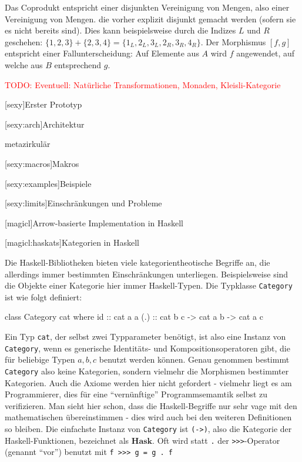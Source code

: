 \documentclass[a4paper, bibgerm]{article}
\newcommand\icode[1]{\lstinline?#1?}
\newcommand{\todo}[1]{
  \textcolor{red}{TODO: #1}
}
\newcommand\lsection{}
\newcommand\lsubsection{}
\begin{document}
Das Coprodukt entspricht einer disjunkten Vereinigung von Mengen, also
einer Vereinigung von Mengen. die vorher explizit disjunkt gemacht
werden (sofern sie es nicht bereits sind). Dies kann beispielsweise durch
die Indizes $L$ und $R$ geschehen: $\{1,2,3\} + \{2,3,4\} =
\{1_L,2_L,3_L,2_R,3_R,4_R\}$. Der Morphismus $[f,g]$ entspricht einer
Fallunterscheidung: Auf Elemente aus $A$ wird $f$ angewendet, auf welche
aus $B$ entsprechend $g$.

\todo{Eventuell: Natürliche Transformationen, Monaden, Kleisli-Kategorie}

\lsection[sexy]{Erster Prototyp}

\lsubsection[sexy:arch]{Architektur}

metazirkulär

\lsubsection[sexy:macros]{Makros}

\lsubsection[sexy:examples]{Beispiele}

\lsubsection[sexy:limits]{Einschränkungen und Probleme}

\lsection[magicl]{Arrow-basierte Implementation in Haskell}

\lsubsection[magicl:haskats]{Kategorien in Haskell}

Die Haskell-Bibliotheken bieten viele kategorientheotische Begriffe an,
die allerdings immer bestimmten Einschränkungen
unterliegen. Beispielsweise sind die Objekte einer Kategorie hier immer
Haskell-Typen. Die Typklasse \icode{Category} ist wie folgt definiert:
\begin{code}
class Category cat where
  id   :: cat a a
  (.) :: cat b c -> cat a b -> cat a c
\end{code}
Ein Typ \icode{cat}, der selbst zwei Typparameter benötigt, ist also eine
Instanz von \icode{Category}, wenn es generische Identitäts- und
Kompositionsoperatoren gibt, die für beliebige Typen $a,b,c$ benutzt
werden können. Genau genommen bestimmt \icode{Category} also keine
Kategorien, sondern vielmehr die Morphismen bestimmter Kategorien. Auch
die Axiome werden hier nicht gefordert - vielmehr liegt es am
Programmierer, dies für eine "`vernünftige"' Programmsemamtik selbst zu
verifizieren. Man sieht hier schon, dass die Haskell-Begriffe nur sehr
vage mit den mathematischen übereinstimmen - dies wird auch bei den
weiteren Definitionen so bleiben. Die einfachste Instanz von
\icode{Category} ist \icode{(->)}, also die Kategorie der
Haskell-Funktionen, bezeichnet als $\mathbf{Hask}$.
Oft wird statt \icode{.} der \icode{>>>}-Operator (genannt "`vor"') %
benutzt mit \icode{f >>> g = g . f} %
\end{document}
